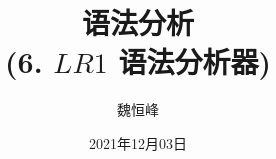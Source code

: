 \documentclass[]{beamer}
\title[语法分析]{语法分析 \\ (6. $LR1$ 语法分析器)}
\author[魏恒峰]{\large 魏恒峰}
\institute{hfwei@nju.edu.cn}
\date{2021年12月03日}
\begin{document}
\maketitle



\thankyou{}

\end{document}
